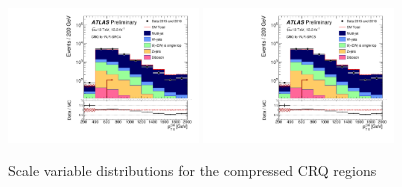 \begin{figure}[tbp]
\begin{center}
\includegraphics[width=0.45\textwidth]{figures/ATLAS-CONF-2016-078_INT/N-1Plots/AtlasStyle/Preliminary/CRQ_SRJigsawSRC4_LastCut_CRQ_minusone}
\includegraphics[width=0.45\textwidth]{figures/ATLAS-CONF-2016-078_INT/N-1Plots/AtlasStyle/Preliminary/CRQ_SRJigsawSRC5_LastCut_CRQ_minusone}
\end{center}
\caption{Scale variable distributions for the compressed CRQ regions}
\label{fig:CRQ_SRJigsawSRC1_LastCut_CRQ_minusone}
\end{figure}

